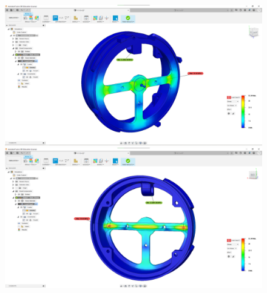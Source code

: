 \begin{figure}[htbp]
    \centering
    \includegraphics[width=\textwidth]{kapitoly/obrazky/tlakova_deska/simulace/F100N,primo,uprostred,pohled_zepredu.png}
    \includegraphics[width=\textwidth]{kapitoly/obrazky/tlakova_deska/simulace/F100N,primo,uprostred,pohled_zezadu.png}
    \label{fig:M1}
\end{figure}


\newpage